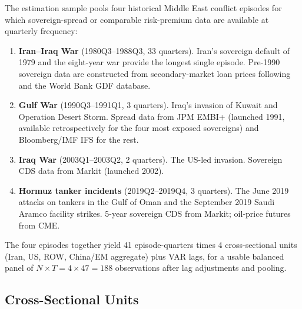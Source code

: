 \documentclass[12pt,a4paper]{article}
\begin{document}
The estimation sample pools four historical Middle East conflict episodes for which sovereign-spread or comparable risk-premium data are available at quarterly frequency:
\begin{enumerate}[itemsep=2pt, topsep=2pt]
    \item \textbf{Iran--Iraq War} (1980Q3--1988Q3, 33 quarters). Iran's sovereign default of 1979 and the eight-year war provide the longest single episode. Pre-1990 sovereign data are constructed from secondary-market loan prices following \citet{borensztein2013debt} and the World Bank GDF database.
    \item \textbf{Gulf War} (1990Q3--1991Q1, 3 quarters). Iraq's invasion of Kuwait and Operation Desert Storm. Spread data from JPM EMBI+ (launched 1991, available retrospectively for the four most exposed sovereigns) and Bloomberg/IMF IFS for the rest.
    \item \textbf{Iraq War} (2003Q1--2003Q2, 2 quarters). The US-led invasion. Sovereign CDS data from Markit (launched 2002).
    \item \textbf{Hormuz tanker incidents} (2019Q2--2019Q4, 3 quarters). The June 2019 attacks on tankers in the Gulf of Oman and the September 2019 Saudi Aramco facility strikes. 5-year sovereign CDS from Markit; oil-price futures from CME.
\end{enumerate}
The four episodes together yield 41 episode-quarters times 4 cross-sectional units (Iran, US, ROW, China/EM aggregate) plus VAR lags, for a usable balanced panel of $N \times T = 4 \times 47 = 188$ observations after lag adjustments and pooling.

\subsection{Cross-Sectional Units}
\end{document}
